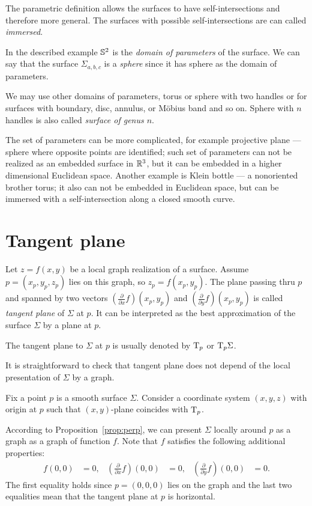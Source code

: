  The parametric definition allows the surfaces to have self-intersections and therefore more general.
The surfaces with possible self-intersections are  can called \emph{immersed}.

In the described example $\mathbb{S}^2$ is the \emph{domain of parameters} of the surface.
We can say that the surface $\Sigma_{a,b,c}$ is a \emph{sphere} since it has sphere as the domain of parameters.

We may use other domains of parameters, torus or sphere with two handles or for surfaces with boundary, disc, annulus, or M\"obius band and so on.
Sphere with $n$ handles is also called \emph{surface of genus $n$}.

The set of parameters can be more complicated, for example projective plane --- sphere where opposite points are identified; such set of parameters can not be realized as an embedded surface in $\mathbb{R}^3$, but it can be embedded in a higher dimensional Euclidean space.
Another example is Klein bottle --- a nonoriented brother torus;
it also can not be embedded in Euclidean space, but can be immersed with a self-intersection along a closed smooth curve.

\section{Tangent plane}

Let $z=f(x,y)$ be a local graph realization of a surface. 
Assume $p=(x_p,y_p,z_p)$ lies on this graph, so $z_p=f(x_p,y_p)$.
The plane passing thru $p$ and spanned by two vectors $(\tfrac{\partial}{\partial x}f)(x_p,y_p)$ and  $(\tfrac{\partial}{\partial y}f)(x_p,y_p)$ is called \emph{tangent plane} of $\Sigma$ at $p$.
It can be interpreted as the best approximation of the surface $\Sigma$ by a plane at $p$.

The tangent plane to $\Sigma$ at $p$ is usually denoted by $\mathrm{T}_p$ or $\mathrm{T}_p\Sigma$.

It is straightforward to check that tangent plane does not depend of the local presentation of $\Sigma$ by a graph.

Fix a point $p$ is a smooth surface $\Sigma$.
Consider a coordinate system $(x,y,z)$ with origin at $p$ such that $(x,y)$-plane coincides with $\mathrm{T}_p$.

According to Proposition~\ref{prop:perp}, 
we can present $\Sigma$ locally around $p$ as a graph as a graph of function $f$.
Note that $f$ satisfies the following additional properties:
\begin{align*}
f(0,0)&=0,
&
(\tfrac{\partial}{\partial x}f)(0,0)&=0,
&
(\tfrac{\partial}{\partial y}f)(0,0)&=0.
\end{align*}
The first equality holds since $p=(0,0,0)$ lies on the graph and the last two equalities mean that the tangent plane at $p$ is horizontal.

